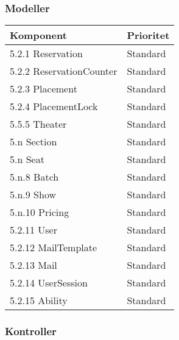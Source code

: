 \documentclass[a4paper, twoside, 11pt, titlepage]{article}
\begin{document}
		\subsubsection{Modeller}


		\begin {table} [ht] \begin{tabular} {  p{3.5cm} p{9.6cm} }
			\hline
			 Komponent  &  Prioritet   \\
			\hline
			 5.2.1 Reservation  &  Standard   \\
			\hline
			 5.2.2 ReservationCounter  &  Standard   \\
			\hline
			 5.2.3 Placement  &  Standard   \\
			\hline
			 5.2.4 PlacementLock  &  Standard   \\
			\hline
			 5.5.5 Theater   &  Standard   \\
			\hline
			 5.n Section  &  Standard   \\
			\hline
			 5.n Seat  &  Standard   \\
			\hline
			 5.n.8 Batch  &  Standard   \\
			\hline
			 5.n.9 Show  &  Standard   \\
			\hline
			 5.n.10 Pricing  &  Standard   \\
			\hline
			 5.2.11 User  &  Standard   \\
			\hline
			 5.2.12 MailTemplate  &  Standard   \\
			\hline
			 5.2.13 Mail  &  Standard   \\
			\hline
			 5.2.14 UserSession  &  Standard   \\
			\hline
			 5.2.15 Ability  &  Standard   \\
			\hline
		\end{tabular} \end{table} \FloatBarrier


		\subsubsection{Kontroller}
\end{document}
